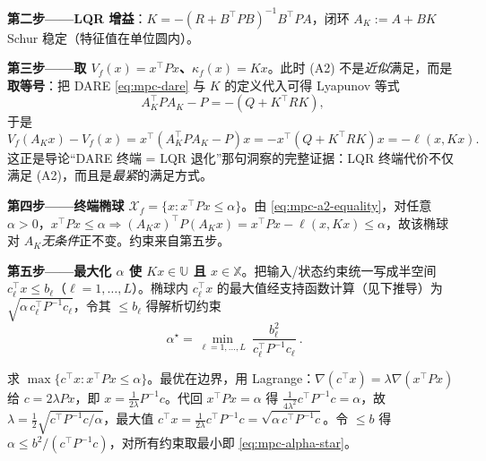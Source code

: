 \textbf{第二步——LQR 增益}：$K=-(R+B^\top PB)^{-1}B^\top PA$，闭环 $A_K:=A+BK$ Schur 稳定（特征值在单位圆内）。

\textbf{第三步——取 $V_f(x)=x^\top Px$、$\kappa_f(x)=Kx$}。此时 (A2) 不是\emph{近似}满足，而是\textbf{取等号}：把 DARE \cref{eq:mpc-dare} 与 $K$ 的定义代入可得 Lyapunov 等式
\begin{equation}
  A_K^\top PA_K-P=-(Q+K^\top RK),
  \label{eq:mpc-dare-lyap}
\end{equation}
于是
\begin{equation}
  V_f(A_Kx)-V_f(x)=x^\top(A_K^\top PA_K-P)x=-x^\top(Q+K^\top RK)x=-\ell(x,Kx).
  \label{eq:mpc-a2-equality}
\end{equation}
这正是导论“DARE 终端 = LQR 退化”那句洞察的完整证据：LQR 终端代价不仅满足 (A2)，而且是\emph{最紧}的满足方式。

\textbf{第四步——终端椭球 $\mathcal X_f=\{x:x^\top Px\le\alpha\}$}。由 \cref{eq:mpc-a2-equality}，对任意 $\alpha>0$，$x^\top Px\le\alpha\Rightarrow (A_Kx)^\top P(A_Kx)=x^\top Px-\ell(x,Kx)\le\alpha$，故该椭球对 $A_K$\emph{无条件}正不变。约束来自第五步。

\textbf{第五步——最大化 $\alpha$ 使 $Kx\in\mathbb U$ 且 $x\in\mathbb X$}。把输入/状态约束统一写成半空间 $c_\ell^\top x\le b_\ell$（$\ell=1,\dots,L$）。椭球内 $c_\ell^\top x$ 的最大值经支持函数计算（见下推导）为 $\sqrt{\alpha\,c_\ell^\top P^{-1}c_\ell}$，令其 $\le b_\ell$ 得解析切约束
\begin{equation}
  \boxed{\ \alpha^\star=\min_{\ell=1,\dots,L}\ \frac{b_\ell^2}{c_\ell^\top P^{-1}c_\ell}\ }.
  \label{eq:mpc-alpha-star}
\end{equation}

\begin{derivation}
求 $\max\{c^\top x:x^\top Px\le\alpha\}$。最优在边界，用 Lagrange：$\nabla(c^\top x)=\lambda\nabla(x^\top Px)$ 给 $c=2\lambda Px$，即 $x=\tfrac1{2\lambda}P^{-1}c$。代回 $x^\top Px=\alpha$ 得 $\tfrac1{4\lambda^2}c^\top P^{-1}c=\alpha$，故 $\lambda=\tfrac12\sqrt{c^\top P^{-1}c/\alpha}$，最大值 $c^\top x=\tfrac1{2\lambda}c^\top P^{-1}c=\sqrt{\alpha\,c^\top P^{-1}c}$。令 $\le b$ 得 $\alpha\le b^2/(c^\top P^{-1}c)$，对所有约束取最小即 \cref{eq:mpc-alpha-star}。
\end{derivation}

